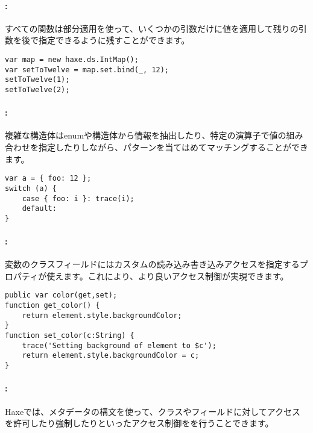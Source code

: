 \paragraph{:} 

すべての関数は部分適用を使って、いくつかの引数だけに値を適用して残りの引数を後で指定できるように残すことができます。

\begin{lstlisting}
var map = new haxe.ds.IntMap();
var setToTwelve = map.set.bind(_, 12);
setToTwelve(1);
setToTwelve(2);
\end{lstlisting}

\paragraph{:} 

複雑な構造体はenumや構造体から情報を抽出したり、特定の演算子で値の組み合わせを指定したりしながら、パターンを当てはめてマッチングすることができます。

\begin{lstlisting}
var a = { foo: 12 };
switch (a) {
    case { foo: i }: trace(i);
    default:
}
\end{lstlisting}

\paragraph{:}

変数のクラスフィールドにはカスタムの読み込み書き込みアクセスを指定するプロパティが使えます。これにより、より良いアクセス制御が実現できます。

\begin{lstlisting}
public var color(get,set);
function get_color() {
    return element.style.backgroundColor;
}
function set_color(c:String) {
    trace('Setting background of element to $c');
    return element.style.backgroundColor = c;
}
\end{lstlisting}

\paragraph{:}

Haxeでは、メタデータの構文を使って、クラスやフィールドに対してアクセスを許可したり強制したりといったアクセス制御をを行うことできます。

